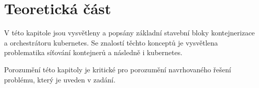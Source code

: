 \chapter{Teoretická část}
\begin{chapterabstract}
V této kapitole jsou vysvětleny a popsány základní stavební bloky kontejnerizace a orchestrátoru kubernetes. Se znalostí těchto konceptů je vysvětlena problematika síťování kontejnerů a následně i kubernetes.  

Porozumění této kapitoly je kritické pro porozumění navrhovaného řešení problému, který je uveden v zadání.
\end{chapterabstract}




